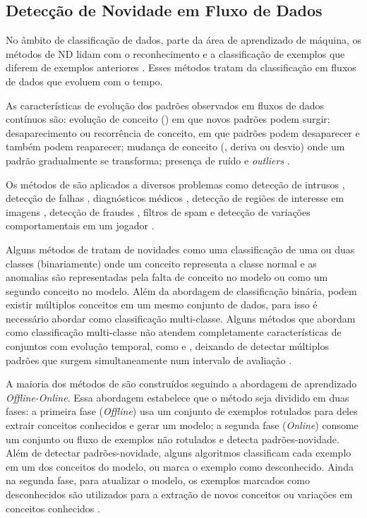 \subsection{Detecção de Novidade em Fluxo de Dados}

No âmbito de classificação de dados, parte da área de aprendizado de máquina, os
métodos de \acf{ND} lidam com o reconhecimento e a classificação de exemplos
que diferem de exemplos anteriores \cite{Markou2003,Perner2009,Gama2010}.
Esses métodos tratam da classificação em fluxos de dados que evoluem com o tempo.

As características de evolução dos padrões observados em fluxos de dados contínuos são: 
evolução de conceito (\evolution) em que novos padrões podem surgir;
desaparecimento ou recorrência de conceito, em que padrões podem desaparecer e
também podem reaparecer;
mudança de conceito (\drift, deriva ou desvio) onde um padrão
gradualmente se transforma;
presença de ruído e \emph{outliers} \cite{Gama2010}.

Os métodos de \nd são aplicados a diversos problemas como
detecção de intrusos \cite{Coull2003,Spinosa2008,Viegas2019,Cassales2019},
detecção de falhas \cite{Zhang2006},
diagnósticos médicos \cite{Perner2009},
detecção de regiões de interesse em imagens \cite{singh2004approach},
detecção de fraudes \cite{wang2003mining,Abdallah201690}, 
filtros de spam \cite{Hayat2010dct} e
detecção de variações comportamentais em um jogador \cite{Vallim20136258}.

Alguns métodos de \nd tratam de novidades como uma classificação de uma
ou duas classes (binariamente) onde um conceito representa a classe normal e as anomalias
são representadas pela falta de conceito no modelo ou como um segundo conceito
no modelo.
Além da abordagem de classificação binária, podem existir múltiplos conceitos em um mesmo
conjunto de dados, para isso é necessário abordar \nd como classificação
multi-classe.
Alguns métodos que abordam \nd como classificação multi-classe não
atendem completamente características de conjuntos com 
evolução temporal,
como \evolution e \drift, deixando de detectar múltiplos padrões que surgem
simultaneamente num intervalo de avaliação \cite{Faria2016ndds,Gama2010}.

A maioria dos métodos de \nd são construídos seguindo a abordagem de aprendizado
\emph{Offline-Online}. Essa abordagem estabelece que o método seja dividido em
duas fases:
a primeira fase (\emph{Offline}) usa um conjunto de exemplos rotulados para
deles extrair conceitos conhecidos e gerar um modelo;
a segunda fase (\emph{Online}) consome um conjunto ou fluxo de exemplos não
rotulados e detecta padrões-novidade.
Além de detectar padrões-novidade, alguns algoritmos classificam cada exemplo
em um dos conceitos do modelo, ou marca o exemplo como desconhecido.
Ainda na segunda fase, para atualizar o modelo, os exemplos marcados como
desconhecidos são utilizados para a extração de novos conceitos ou variações em
conceitos conhecidos \cite{Gama2010}.

